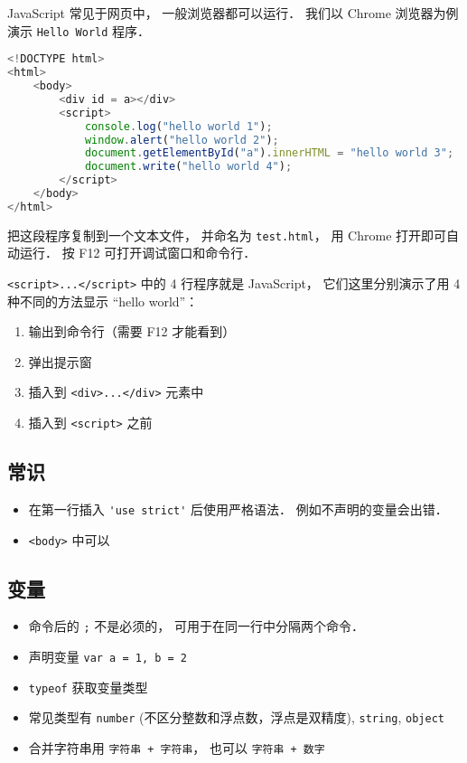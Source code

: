 
JavaScript 常见于网页中， 一般浏览器都可以运行． 我们以 Chrome 浏览器为例演示 \verb|Hello World| 程序．

\begin{lstlisting}[language=js]
<!DOCTYPE html>
<html>
	<body>
		<div id = a></div>
		<script>
            console.log("hello world 1");
            window.alert("hello world 2");
			document.getElementById("a").innerHTML = "hello world 3";
            document.write("hello world 4");
		</script>
	</body>
</html>
\end{lstlisting}
把这段程序复制到一个文本文件， 并命名为 \verb|test.html|， 用 Chrome 打开即可自动运行． 按 F12 可打开调试窗口和命令行．

\verb|<script>...</script>| 中的 4 行程序就是 JavaScript， 它们这里分别演示了用 4 种不同的方法显示 “hello world”：
\begin{enumerate}
\item 输出到命令行（需要 F12 才能看到）
\item 弹出提示窗
\item 插入到 \verb|<div>...</div>| 元素中
\item 插入到 \verb|<script>| 之前
\end{enumerate}

\subsection{常识}
\begin{itemize}
\item 在第一行插入 \verb|'use strict'| 后使用严格语法． 例如不声明的变量会出错．
\item \verb|<body>| 中可以
\end{itemize}

\subsection{变量}
\begin{itemize}
\item 命令后的 \verb|;| 不是必须的， 可用于在同一行中分隔两个命令．
\item 声明变量 \verb|var a = 1, b = 2|
\item \verb|typeof| 获取变量类型
\item 常见类型有 \verb|number| (不区分整数和浮点数，浮点是双精度), \verb|string|, \verb|object|
\item 合并字符串用 \verb|字符串 + 字符串|， 也可以 \verb|字符串 + 数字|
\end{itemize}
